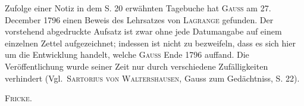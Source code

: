 \noindent\hspace*{\parindent}Zufolge einer Notiz in dem S. 20 erwähnten Tagebuche hat \textsc{Gauss} am 27. December 1796 einen
Beweis des Lehrsatzes von \textsc{Lagrange} gefunden. Der vorstehend abgedruckte Aufsatz ist zwar
ohne jede Datumangabe auf einem einzelnen Zettel aufgezeichnet; indessen ist nicht zu
bezweifeln, dass es sich hier um die Entwicklung handelt, welche \textsc{Gauss} Ende 1796 auffand.
Die Veröffentlichung wurde seiner Zeit nur durch verschiedene Zufälligkeiten verhindert
(Vgl.\ \textsc{Sartorius von Waltershausen}, Gauss zum Gedächtniss, S. 22).

\begin{flushright}
\textsc{Fricke}.
\end{flushright}
